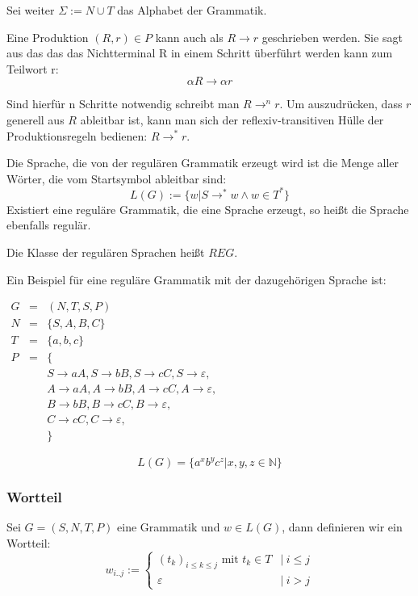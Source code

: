 \documentclass[a4paper,12pt]{article}
\begin{document}
Sei weiter $\Sigma := N \cup T$ das Alphabet der Grammatik.

Eine Produktion $(R,r)\in P$ kann auch als $R\rightarrow r$ geschrieben werden.
Sie sagt aus das das das Nichtterminal R in einem Schritt überführt werden kann zum Teilwort r:
\[ \alpha R \rightarrow \alpha r \]

Sind hierfür n Schritte notwendig schreibt man
$R \rightarrow^n r$. Um auszudrücken, dass $r$ generell aus $R$ ableitbar ist, kann man sich der reflexiv-transitiven Hülle der Produktionsregeln bedienen: $R \rightarrow ^* r$.

Die Sprache, die von der regulären Grammatik erzeugt wird ist die Menge aller Wörter, die vom Startsymbol ableitbar sind: 
\[ L(G) := \{w | S \rightarrow^* w \land w\in T^* \} \]
Existiert eine reguläre Grammatik, die eine Sprache erzeugt, so heißt die Sprache ebenfalls regulär.

Die Klasse der regulären Sprachen heißt $REG$.

Ein Beispiel für eine reguläre Grammatik mit der dazugehörigen Sprache ist: 

\begin{center}
 $
\begin{array}{rcl}
  G &=& (N,T,S,P) \\
  N &=& \{ S, A, B, C \} \\
  T &=& \{ a, b, c \} \\
  P &=& \{ \\ 
  &&  S \rightarrow a A,
    S \rightarrow b B,
    S \rightarrow c C,
    S \rightarrow \varepsilon,\\
  &&  A \rightarrow a A,
    A \rightarrow b B,
    A \rightarrow c C,
    A \rightarrow \varepsilon,\\
  &&  B \rightarrow b B,
    B \rightarrow c C,
    B \rightarrow \varepsilon, \\
  &&  C \rightarrow c C,
    C \rightarrow \varepsilon,\\
  &&\}
\end{array}
$ 
\end{center}

\[ L(G) = \{ a^xb^yc^z | x,y,z\in \mathbb{N} \} \] 




\subsubsection*{Wortteil}

Sei $G=(S,N,T,P)$ eine Grammatik und $w\in L(G)$, dann definieren wir ein Wortteil: 
\[ 
w_{i..j} := 
\begin{cases}
  (t_k)_{i\leq k \leq j}\text{ mit }t_k\in T &|\ i\leq j \\
  \varepsilon &|\ i>j
\end{cases}
\] 
\end{document}
